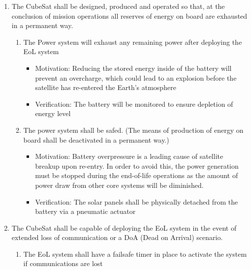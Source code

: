 \begin{enumerate}
\begin{enumerate}
\begin{enumerate}
\begin{itemize}
                    \item Verification: Literature review of the materials to ensure disintegration.
                \end{itemize}
        \end{enumerate}
        \item The CubeSat shall be designed, produced and operated so that, at the conclusion of mission operations all reserves of energy on board are exhausted in a permanent way.
        \begin{enumerate}
            \item The Power system will exhaust any remaining power after deploying the EoL system 
                \begin{itemize}
                    \item Motivation: Reducing the stored energy inside of the battery will prevent an overcharge, which could lead to an explosion before the satellite has re-entered the Earth’s atmosphere
                    \item Verification: The battery will be monitored to ensure depletion of energy level
                \end{itemize}
            \item The power system shall be safed. (The means of production of energy on board shall be deactivated in a permanent way.) 
                \begin{itemize}
                    \item Motivation: Battery overpressure is a leading cause of satellite breakup upon re-entry. In order to avoid this, the power generation must be stopped during the end-of-life operations as the amount of power draw from other core systems will be diminished.
                    \item Verification: The solar panels shall be physically detached from the battery via a pneumatic actuator 
                \end{itemize}
             \end{enumerate} 
            \item The CubeSat shall be capable of deploying the EoL system in the event of extended loss of communication or a DoA (Dead on Arrival) scenario. 
            \begin{enumerate}
                \item The EoL system shall have a failsafe timer in place to activate the system if communications are lost 
                \begin{itemize}

\end{itemize}
\end{enumerate}
\end{enumerate}
\end{enumerate}

